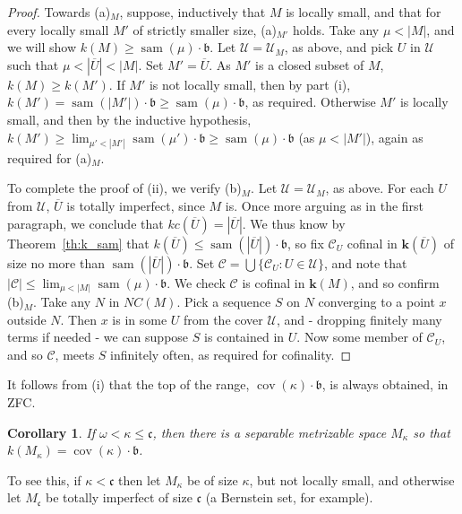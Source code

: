 \documentclass{article}
\newtheorem{cor}[thm]{Corollary}
\newcommand{\cl}[1]{\overline{#1}}
\begin{document}
\begin{proof}
Towards (a)${}_M$, suppose, inductively that $M$ is locally small, and that for every locally small $M'$ of strictly smaller size, (a)${}_{M'}$ holds. 
Take any $\mu < |M|$, and we will show $k(M) \ge \mathop{sam}(\mu)\cdot\mathfrak{b}$. 
Let $\mathcal{U}=\mathcal{U}_M$, as above, and pick $U$ in $\mathcal{U}$ such that $\mu < |\cl{U}| < |M|$. 
Set $M'=\cl{U}$. As $M'$ is a closed subset of $M$, $k(M) \ge k(M')$. 
If $M'$ is not locally small, then by part (i), $k(M') = \mathop{sam}(|M'|)\cdot\mathfrak{b} \ge \mathop{sam}(\mu)\cdot\mathfrak{b}$, as required. 
Otherwise $M'$ is locally small, and then by the inductive hypothesis, $k(M') \ge \lim_{\mu' < |M'|} \mathop{sam}(\mu')\cdot\mathfrak{b} \ge \mathop{sam}(\mu)\cdot\mathfrak{b}$ (as $\mu < |M'|$), again as required for (a)${}_M$.

To complete the proof of (ii), we verify (b)${}_M$. 
Let $\mathcal{U}=\mathcal{U}_M$, as above. For each $U$ from $\mathcal{U}$, $\cl{U}$ is totally imperfect, since $M$ is. Once more arguing as in the first paragraph, we conclude that $kc(\cl{U})=|\cl{U}|$. We thus know by Theorem~\ref{th:k_sam} that $k(\cl{U}) \le \mathop{sam}(|\cl{U}|)\cdot\mathfrak{b}$, so fix $\mathcal{C}_U$ cofinal in $\mathbf{k}(\cl{U})$ of size no more than $\mathop{sam}(|\cl{U}|)\cdot\mathfrak{b}$. 
Set $\mathcal{C}=\bigcup \{ \mathcal{C}_U : U \in \mathcal{U}\}$, and note that $|\mathcal{C}| \le \lim_{\mu < |M|} \mathop{sam}(\mu) \cdot\mathfrak{b}$. We check $\mathcal{C}$ is cofinal in $\mathbf{k}(M)$, and so confirm (b)${}_M$. 
Take any $N$ in $NC(M)$. Pick a sequence $S$ on $N$ converging to a point $x$ outside $N$. Then $x$ is in some $U$ from the cover $\mathcal{U}$, and - dropping finitely many terms if needed - we can suppose $S$ is contained in $U$. Now some member of $\mathcal{C}_U$, and so $\mathcal{C}$,  meets $S$ infinitely often, as required for cofinality.
\end{proof}

 
It follows from (i) that the top of the range, $\mathop{cov}(\kappa)\cdot\mathfrak{b}$, is always obtained, in \textsc{ZFC}.
\begin{cor}
    If $\omega < \kappa \le \mathfrak{c}$, then there is a separable metrizable space $M_\kappa$ so that $k(M_\kappa)=\mathop{cov}(\kappa)\cdot\mathfrak{b}$.
\end{cor}
To see this, if $\kappa<\mathfrak{c}$ then let $M_\kappa$ be of size $\kappa$, but not locally small, and otherwise  let $M_\mathfrak{c}$ be totally imperfect of size $\mathfrak{c}$ (a Bernstein set, for example).
\end{document}
